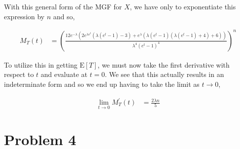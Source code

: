 \documentclass[11pt]{article}
\begin{document}
With this general form of the MGF for $X$, we have only to
exponentiate this expression by $n$ and so,

\begin{align*}
  M_T(t) &= \left( \frac{12 e^{-\lambda } \left(2 e^{\lambda  e^t}
           \left(\lambda \left(e^t-1\right)-3\right)+e^{\lambda}
           \left(\lambda \left(e^t-1\right) \left(\lambda
           \left(e^t-1\right)+4\right)+6\right)\right)}{\lambda^4
           \left(e^t-1\right)^4} \right)^n
\end{align*}

To utilize this in getting $\mathrm{E}[T]$, we must now take the first
derivative with respect to $t$ and evaluate at $t=0$.  We see that
this actually results in an indeterminate form and so we end up having
to take the limit as $t \rightarrow 0$,

\begin{align*}
  \lim_{t \rightarrow 0} M_T^{'}(t) &= \frac{2\lambda n}{5}
\end{align*}

\section*{Problem 4}
\end{document}

